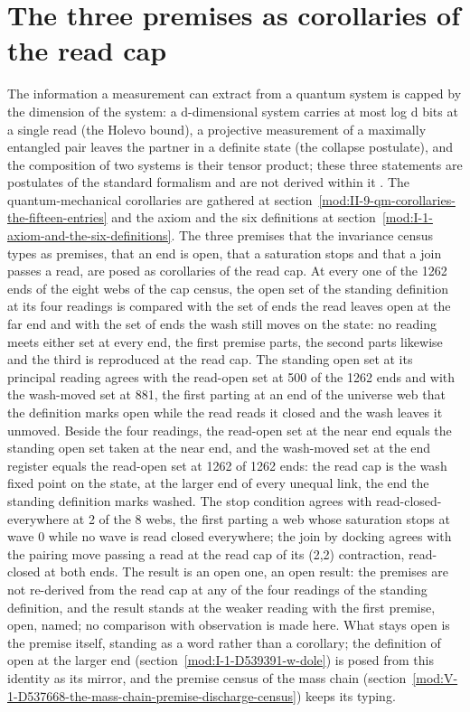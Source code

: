 \section{The three premises as corollaries of the read cap}\label{mod:II-9-D539176-w-tprd}
The information a measurement can extract from a quantum system is capped by the dimension of the system: a d-dimensional system carries at most log d bits at a single read (the Holevo bound), a projective measurement of a maximally entangled pair leaves the partner in a definite state (the collapse postulate), and the composition of two systems is their tensor product; these three statements are postulates of the standard formalism and are not derived within it \cite{Holevo1973,Nielsen2000}. The quantum-mechanical corollaries are gathered at section~\ref{mod:II-9-qm-corollaries-the-fifteen-entries} and the axiom and the six definitions at section~\ref{mod:I-1-axiom-and-the-six-definitions}.
The three premises that the invariance census types as premises, that an end is open, that a saturation stops and that a join passes a read, are posed as corollaries of the read cap. At every one of the 1262 ends of the eight webs of the cap census, the open set of the standing definition at its four readings is compared with the set of ends the read leaves open at the far end and with the set of ends the wash still moves on the state: no reading meets either set at every end, the first premise parts, the second parts likewise and the third is reproduced at the read cap.
The standing open set at its principal reading agrees with the read-open set at 500 of the 1262 ends and with the wash-moved set at 881, the first parting at an end of the universe web that the definition marks open while the read reads it closed and the wash leaves it unmoved. Beside the four readings, the read-open set at the near end equals the standing open set taken at the near end, and the wash-moved set at the end register equals the read-open set at 1262 of 1262 ends: the read cap is the wash fixed point on the state, at the larger end of every unequal link, the end the standing definition marks washed. The stop condition agrees with read-closed-everywhere at 2 of the 8 webs, the first parting a web whose saturation stops at wave 0 while no wave is read closed everywhere; the join by docking agrees with the pairing move passing a read at the read cap of its (2,2) contraction, read-closed at both ends.
The result is an open one, an open result: the premises are not re-derived from the read cap at any of the four readings of the standing definition, and the result stands at the weaker reading with the first premise, open, named; no comparison with observation is made here.
What stays open is the premise itself, standing as a word rather than a corollary; the definition of open at the larger end (section~\ref{mod:I-1-D539391-w-dole}) is posed from this identity as its mirror, and the premise census of the mass chain (section~\ref{mod:V-1-D537668-the-mass-chain-premise-discharge-census}) keeps its typing.
\par\medskip{}\label{narr:close:2-9}\par

